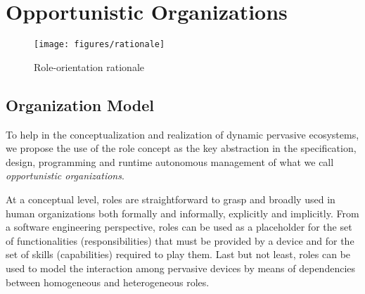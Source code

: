 \section{Opportunistic Organizations}\label{sec:edge_spaces}

\begin{figure*}[t!]
	\centering
	\texttt{[image: figures/rationale]}
	\caption{Role-orientation rationale}
	\label{fig:rationale}
\end{figure*}

\subsection{Organization Model}


To help in the conceptualization and realization of dynamic pervasive ecosystems, we propose the use of the role concept as the key abstraction in the specification, design, programming and runtime autonomous management of what we call \textit{opportunistic organizations}. 

At a conceptual level, roles are straightforward to grasp and broadly used in human organizations both formally and informally, explicitly and implicitly. From a software engineering perspective, roles can be used as a placeholder for the set of functionalities (responsibilities) that must be provided by a device and for the set of skills (capabilities) required to play them. Last but not least, roles can be used to model the interaction among pervasive devices by means of dependencies between homogeneous and heterogeneous roles.



